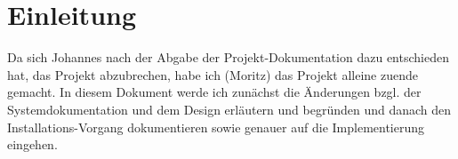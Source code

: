 \chapter{Einleitung}

Da sich Johannes nach der Abgabe der Projekt-Dokumentation dazu entschieden hat, das Projekt abzubrechen, habe ich (Moritz) das Projekt alleine zuende gemacht. In diesem Dokument werde ich zunächst die Änderungen bzgl. der Systemdokumentation und dem Design erläutern und begründen und danach den Installations-Vorgang dokumentieren sowie genauer auf die Implementierung eingehen.